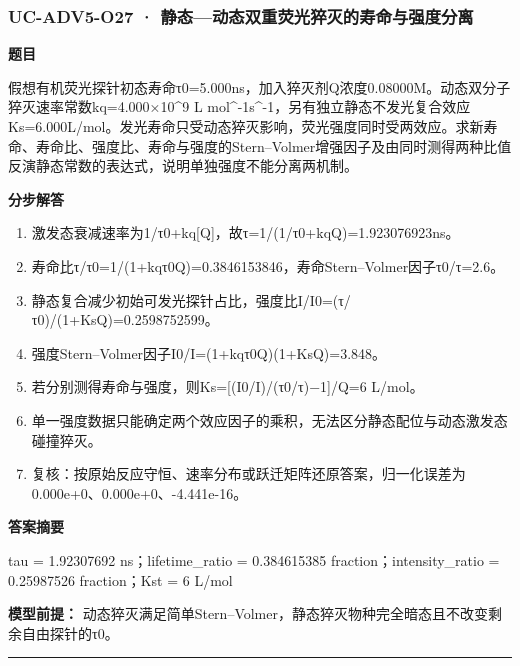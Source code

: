 \documentclass[UTF8,11pt,a4paper]{ctexart}
\begin{document}
\subsubsection*{UC-ADV5-O27 · 静态—动态双重荧光猝灭的寿命与强度分离}
\noindent\textbf{题目}\par
假想有机荧光探针初态寿命τ0=5.000ns，加入猝灭剂Q浓度0.08000M。动态双分子猝灭速率常数kq=4.000×10\textasciicircum{}9 L mol\textasciicircum{}-1s\textasciicircum{}-1，另有独立静态不发光复合效应Ks=6.000L/mol。发光寿命只受动态猝灭影响，荧光强度同时受两效应。求新寿命、寿命比、强度比、寿命与强度的Stern–Volmer增强因子及由同时测得两种比值反演静态常数的表达式，说明单独强度不能分离两机制。\par
\medskip\noindent\textbf{分步解答}
\begin{enumerate}
\item 激发态衰减速率为1/τ0+kq[Q]，故τ=1/(1/τ0+kqQ)=1.923076923ns。
\item 寿命比τ/τ0=1/(1+kqτ0Q)=0.3846153846，寿命Stern–Volmer因子τ0/τ=2.6。
\item 静态复合减少初始可发光探针占比，强度比I/I0=(τ/τ0)/(1+KsQ)=0.2598752599。
\item 强度Stern–Volmer因子I0/I=(1+kqτ0Q)(1+KsQ)=3.848。
\item 若分别测得寿命与强度，则Ks=[(I0/I)/(τ0/τ)−1]/Q=6 L/mol。
\item 单一强度数据只能确定两个效应因子的乘积，无法区分静态配位与动态激发态碰撞猝灭。
\item 复核：按原始反应守恒、速率分布或跃迁矩阵还原答案，归一化误差为0.000e+0、0.000e+0、-4.441e-16。
\end{enumerate}
\noindent\textbf{答案摘要}\par
tau = 1.92307692 ns；lifetime\_ratio = 0.384615385 fraction；intensity\_ratio = 0.25987526 fraction；Kst = 6 L/mol\par
\noindent\textbf{模型前提：}
动态猝灭满足简单Stern–Volmer，静态猝灭物种完全暗态且不改变剩余自由探针的τ0。\par
\medskip\hrule\medskip
{}
\end{document}
